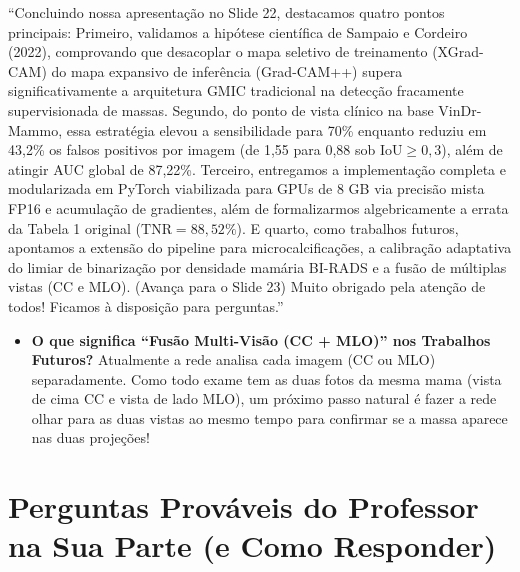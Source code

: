 \documentclass[11pt,a4paper]{article}
\newenvironment{falabox}{%
    \begin{tcolorbox}[colback=speechbg, colframe=speechborder, boxrule=1.2pt, arc=4pt, left=10pt, right=10pt, top=8pt, bottom=8pt, title={\bfseries O QUE VOCÊ DEVE FALAR (Fala Sugerida)}]%
}{%
    \end{tcolorbox}%
}
\newenvironment{explicabox}{%
    \begin{tcolorbox}[colback=explainbg, colframe=explainborder, boxrule=0.8pt, arc=4pt, left=10pt, right=10pt, top=8pt, bottom=8pt, title={\bfseries ENTENDA O QUE VOCÊ ESTÁ FALANDO (Explicação Didática de Cada Termo)}]%
}{%
    \end{tcolorbox}%
}
\begin{document}
\begin{falabox}
``Concluindo nossa apresentação no Slide 22, destacamos quatro pontos principais:
Primeiro, validamos a hipótese científica de Sampaio e Cordeiro (2022), comprovando que desacoplar o mapa seletivo de treinamento (XGrad-CAM) do mapa expansivo de inferência (Grad-CAM++) supera significativamente a arquitetura GMIC tradicional na detecção fracamente supervisionada de massas.
Segundo, do ponto de vista clínico na base VinDr-Mammo, essa estratégia elevou a sensibilidade para 70\% enquanto reduziu em 43,2\% os falsos positivos por imagem (de 1,55 para 0,88 sob $\text{IoU} \ge 0{,}3$), além de atingir AUC global de 87,22\%.
Terceiro, entregamos a implementação completa e modularizada em PyTorch viabilizada para GPUs de 8 GB via precisão mista FP16 e acumulação de gradientes, além de formalizarmos algebricamente a errata da Tabela 1 original ($\text{TNR} = 88{,}52\%$).
E quarto, como trabalhos futuros, apontamos a extensão do pipeline para microcalcificações, a calibração adaptativa do limiar de binarização por densidade mamária BI-RADS e a fusão de múltiplas vistas (CC e MLO).
(Avança para o Slide 23) Muito obrigado pela atenção de todos! Ficamos à disposição para perguntas.''
\end{falabox}

\begin{explicabox}
\begin{itemize}[leftmargin=*, itemsep=4pt]
    \item \textbf{O que significa ``Fusão Multi-Visão (CC + MLO)'' nos Trabalhos Futuros?} Atualmente a rede analisa cada imagem (CC ou MLO) separadamente. Como todo exame tem as duas fotos da mesma mama (vista de cima CC e vista de lado MLO), um próximo passo natural é fazer a rede olhar para as duas vistas ao mesmo tempo para confirmar se a massa aparece nas duas projeções!
\end{itemize}
\end{explicabox}

\section*{Perguntas Prováveis do Professor na Sua Parte (e Como Responder)}
\end{document}
